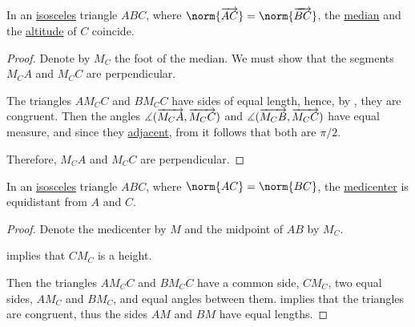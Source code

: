\begin{proposition}\label{thm:triangle_similarity}

  \begin{thmenum}
  \end{thmenum}
\end{proposition}

\begin{proposition}\label{thm:isosceles_median_and_altitude}
  In an \hyperref[def:triangle/isosceles]{isosceles} triangle \( ABC \), where \( \norm{\vect{AC}} = \norm{\vect{BC}} \), the \hyperref[def:triangle_median]{median} and the \hyperref[def:triangle_altitude]{altitude} of \( C \) coincide.
\end{proposition}
\begin{proof}
  Denote by \( M_C \) the foot of the median. We must show that the segments \( M_C A \) and \( M_C C \) are perpendicular.

  The triangles \( A M_C C \) and \( B M_C C \) have sides of equal length, hence, by , they are congruent. Then the angles \( \measuredangle(\overrightarrow{M_C A}, \overrightarrow{M_C C}) \) and \( \measuredangle(\overrightarrow{M_C B}, \overrightarrow{M_C C}) \) have equal measure, and since they \hyperref[def:adjacent_angles]{adjacent}, from  it follows that both are \( \pi / 2 \).

  Therefore, \( M_C A \) and \( M_C C \) are perpendicular.
\end{proof}

\begin{proposition}\label{thm:isosceles_medicenter}
  In an \hyperref[def:triangle/isosceles]{isosceles} triangle \( ABC \), where \( \norm{AC} = \norm{BC} \), the \hyperref[thm:medicenter]{medicenter} is equidistant from \( A \) and \( C \).
\end{proposition}
\begin{proof}
  Denote the medicenter by \( M \) and the midpoint of \( AB \) by \( M_C \).

   implies that \( CM_C \) is a height.

  Then the triangles \( A M_C C \) and \( B M_C C \) have a common side, \( C M_C \), two equal sides, \( A M_C \) and \( B M_C \), and equal angles between them.  implies that the triangles are congruent, thus the sides \( A M \) and \( B M \) have equal lengths.
\end{proof}

